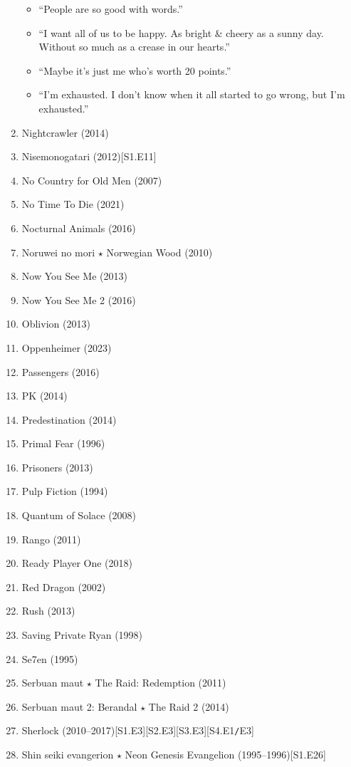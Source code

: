 \documentclass{article}
\begin{document}
\begin{enumerate}
\begin{itemize}
		\item ``People are so good with words.''
		\item ``I want all of us to be happy. As bright \& cheery as a sunny day. Without so much as a crease in our hearts.''
		\item ``Maybe it's just me who's worth 20 points.''
		\item ``I'm exhausted. I don't know when it all started to go wrong, but I'm exhausted.''
	\end{itemize}	
	\item {\sc Nightcrawler} (2014)
	\item {\sc Nisemonogatari} (2012)\hfill[S1.E11]
	\item {\sc No Country for Old Men} (2007)
	\item No Time To Die (2021)
	\item {\sc Nocturnal Animals} (2016)
	\item {\sc Noruwei no mori $\star$ Norwegian Wood} (2010)
	\item {\sc Now You See Me} (2013)
	\item {\sc Now You See Me 2} (2016)
	\item {\sc Oblivion} (2013)
	\item {\sc Oppenheimer} (2023)
	\item {\sc Passengers} (2016)
	\item {\sc PK} (2014)
	\item {\sc Predestination} (2014)
	\item {\sc Primal Fear} (1996)
	\item {\sc Prisoners} (2013)
	\item {\sc Pulp Fiction} (1994)
	\item {\sc Quantum of Solace} (2008)
	\item {\sc Rango} (2011)
	\item {\sc Ready Player One} (2018)
	\item {\sc Red Dragon} (2002)
	\item {\sc Rush} (2013)
	\item {\sc Saving Private Ryan} (1998)
	\item {\sc Se7en} (1995)
	\item {\sc Serbuan maut $\star$ The Raid: Redemption} (2011)
	\item {\sc Serbuan maut 2: Berandal $\star$ The Raid 2} (2014)
	\item {\sc Sherlock} (2010--2017)\hfill[S1.E3][S2.E3][S3.E3][S4.E1{\tt/}E3]
	\item Shin seiki evangerion $\star$ Neon Genesis Evangelion (1995--1996)\hfill[S1.E26]

\end{enumerate}
\end{document}
